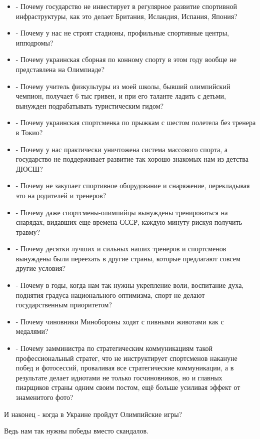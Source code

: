 \begin{itemize}
\item - Почему государство не инвестирует в регулярное развитие спортивной инфраструктуры, как это делает Британия, Исландия, Испания, Япония? 
\item - Почему у нас не строят стадионы, профильные спортивные центры, ипподромы? 
\item - Почему украинская сборная по конному спорту в этом году вообще не представлена на Олимпиаде?
\item - Почему учитель физкультуры из моей школы, бывший олимпийский чемпион, получает 6 тыс гривен, и при его таланте ладить с детьми,  вынужден подрабатывать туристическим гидом? 
\item - Почему украинская спортсменка по прыжкам с шестом полетела без тренера в Токио?
\item - Почему у нас практически уничтожена система массового спорта, а государство не поддерживает развитие так хорошо знакомых нам из детства ДЮСШ? 
\item - Почему не закупает спортивное оборудование и снаряжение, перекладывая это на родителей и тренеров? 
\item - Почему даже спортсмены-олимпийцы вынуждены тренироваться на снарядах, видавших еще времена СССР, каждую минуту рискуя получить травму? 
\item - Почему десятки лучших и сильных наших тренеров и спортсменов вынуждены были переехать в другие страны, которые предлагают совсем другие условия?
\item - Почему в годы, когда нам так нужны укрепление воли, воспитание духа, поднятия градуса национального оптимизма, спорт не делают государственным приоритетом? 
\item - Почему чиновники Минобороны ходят с пивными животами как с медалями? 
\item - Почему замминистра по стратегическим коммуникациям такой профессиональный
стратег, что не инструктирует спортсменов накануне побед и фотосессий,
проваливая все стратегические коммуникации, а в результате делает идиотами не
только госчиновников, но и главных пиарщиков страны одним своим постом, ещё
больше усиливая эффект от знаменитого фото? 
\end{itemize}

И наконец - когда в Украине пройдут Олимпийские игры? 

Ведь нам так нужны победы вместо скандалов.
